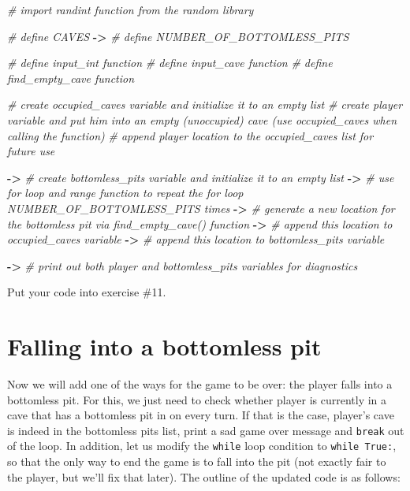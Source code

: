 \documentclass[
]{book}
\newenvironment{Shaded}{\begin{snugshade}}{\end{snugshade}}
\newcommand{\CommentTok}[1]{\textcolor[rgb]{0.56,0.35,0.01}{\textit{#1}}}
\newcommand{\OperatorTok}[1]{\textcolor[rgb]{0.81,0.36,0.00}{\textbf{#1}}}
\begin{document}
\begin{Shaded}
\begin{Highlighting}[]
\CommentTok{\# import randint function from the random library}

\CommentTok{\# define CAVES}
\OperatorTok{{-}\textgreater{}} \CommentTok{\# define NUMBER\_OF\_BOTTOMLESS\_PITS}

\CommentTok{\# define input\_int function}
\CommentTok{\# define input\_cave function}
\CommentTok{\# define find\_empty\_cave function}

\CommentTok{\# create \textasciigrave{}occupied\_caves\textasciigrave{} variable and initialize it to an empty list}
\CommentTok{\# create \textasciigrave{}player\textasciigrave{} variable and put him into an empty (unoccupied) cave (use \textasciigrave{}occupied\_caves\textasciigrave{} when calling the function)}
\CommentTok{\# append player location to the \textasciigrave{}occupied\_caves\textasciigrave{} list for future use}

\OperatorTok{{-}\textgreater{}} \CommentTok{\# create \textasciigrave{}bottomless\_pits\textasciigrave{} variable and initialize it to an empty list}
\OperatorTok{{-}\textgreater{}} \CommentTok{\# use for loop and range function to repeat the for loop NUMBER\_OF\_BOTTOMLESS\_PITS times}
\OperatorTok{{-}\textgreater{}} \CommentTok{\#     generate a new location for the bottomless pit via find\_empty\_cave() function}
\OperatorTok{{-}\textgreater{}} \CommentTok{\#     append this location to \textasciigrave{}occupied\_caves\textasciigrave{} variable}
\OperatorTok{{-}\textgreater{}} \CommentTok{\#     append this location to \textasciigrave{}bottomless\_pits\textasciigrave{} variable}


\OperatorTok{{-}\textgreater{}} \CommentTok{\# print out both player and bottomless\_pits variables for diagnostics}
\end{Highlighting}
\end{Shaded}

Put your code into exercise \#11.

\hypertarget{falling-into-a-bottomless-pit}{%
\section{Falling into a bottomless pit}\label{falling-into-a-bottomless-pit}}

Now we will add one of the ways for the game to be over: the player falls into a bottomless pit. For this, we just need to check whether player is currently in a cave that has a bottomless pit in on every turn. If that is the case, player's cave is indeed in the bottomless pits list, print a sad game over message and \texttt{break} out of the loop. In addition, let us modify the \texttt{while} loop condition to \texttt{while\ True:}, so that the only way to end the game is to fall into the pit (not exactly fair to the player, but we'll fix that later). The outline of the updated code is as follows:
\end{document}
